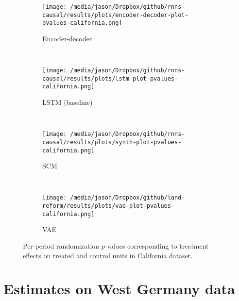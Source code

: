\documentclass[12pt]{article}
\begin{document}
\begin{figure*}[htbp]
    \centering
    \begin{subfigure}[t]{0.5\textwidth}
        \centering
        \texttt{[image: /media/jason/Dropbox/github/rnns-causal/results/plots/encoder-decoder-plot-pvalues-california.png]}
        \caption{Encoder-decoder}
    \end{subfigure}%
        ~ 
    \begin{subfigure}[t]{0.5\textwidth}
        \centering
        \texttt{[image: /media/jason/Dropbox/github/rnns-causal/results/plots/lstm-plot-pvalues-california.png]}
        \caption{LSTM (baseline)}
    \end{subfigure}
        ~ 
    \begin{subfigure}[t]{0.5\textwidth}
        \centering
        \texttt{[image: /media/jason/Dropbox/github/rnns-causal/results/plots/synth-plot-pvalues-california.png]}
        \caption{SCM}
    \end{subfigure}%
         ~ 
	\begin{subfigure}[t]{0.5\textwidth}
		\centering
		\texttt{[image: /media/jason/Dropbox/github/land-reform/results/plots/vae-plot-pvalues-california.png]}
		\caption{VAE}
	\end{subfigure}
    \caption{Per-period randomization $p$-values corresponding to treatment effects on treated and control units in California dataset. \label{california-plot-pvalues}}
\end{figure*}

\section{Estimates on West Germany data}
\end{document}
